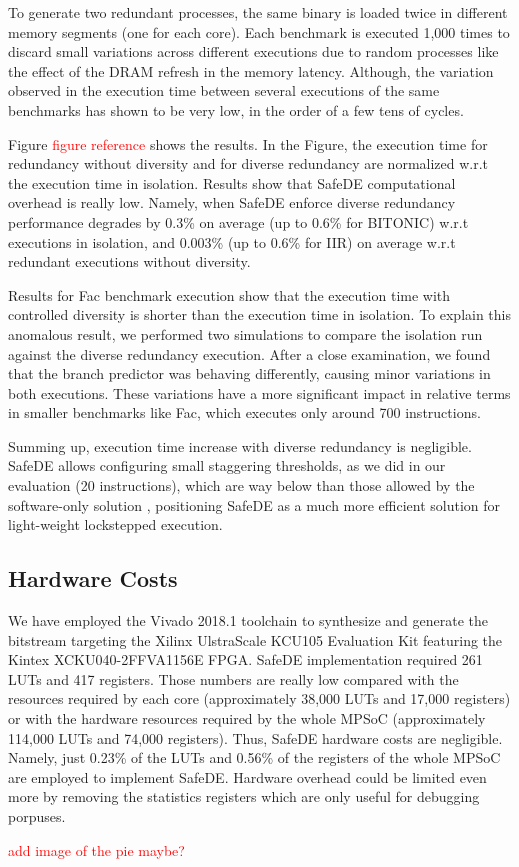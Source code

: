 To generate two redundant processes, the same binary is loaded twice in different memory segments (one for each core). Each benchmark is executed 1,000 times to discard small variations across different executions due to random processes like the effect of the DRAM refresh in the memory latency. Although, the variation observed in the execution time between several executions of the same benchmarks has shown to be very low, in the order of a few tens of cycles.

Figure \textcolor{red}{figure reference} shows the results. In the Figure, the execution time for redundancy without diversity and for diverse redundancy are normalized w.r.t the execution time in isolation. Results show that SafeDE computational overhead is really low. Namely, when SafeDE enforce diverse redundancy performance degrades by 0.3\% on average (up to 0.6\% for BITONIC) w.r.t executions in isolation, and 0.003\% (up to 0.6\% for IIR) on average w.r.t redundant executions without diversity. 

Results for Fac benchmark execution show that the execution time with controlled diversity is shorter than the execution time in isolation. To explain this anomalous result, we performed two simulations to compare the isolation run against the diverse redundancy execution. After a close examination, we found that the branch predictor was behaving differently, causing minor variations in both executions. These variations have a more significant impact in relative terms in smaller benchmarks like Fac, which executes only around 700 instructions. 

Summing up, execution time increase with diverse redundancy is negligible. SafeDE allows configuring small staggering thresholds, as we did in our evaluation (20 instructions), which are way below than those allowed by the software-only solution \cite{alcaide2020software}, positioning SafeDE as a much more efficient solution for light-weight lockstepped execution. 


\bigskip

\subsection{Hardware Costs}
\label{section:Hardware_resources}

We have employed the Vivado 2018.1 toolchain to synthesize and generate the bitstream targeting the Xilinx UlstraScale KCU105 Evaluation Kit featuring the Kintex XCKU040-2FFVA1156E FPGA. SafeDE implementation required 261 LUTs and 417 registers. Those numbers are really low compared with the resources required by each core (approximately 38,000 LUTs and 17,000 registers) or with the hardware resources required by the whole MPSoC (approximately 114,000 LUTs and 74,000 registers). Thus, SafeDE hardware costs are negligible. Namely, just 0.23\% of the LUTs and 0.56\% of the registers of the whole MPSoC are employed to implement SafeDE. Hardware overhead could be limited even more by removing the statistics registers which are only useful for debugging porpuses.

\textcolor{red}{add image of the pie maybe?}
\bigskip


